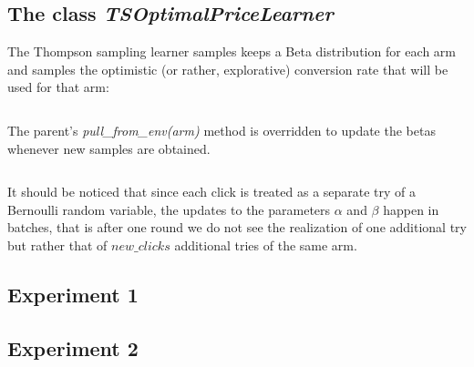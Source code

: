 \documentclass[11pt]{article} %
\begin{document}
\begin{samepage}
\subsection{The class \textit{TSOptimalPriceLearner}}
The Thompson sampling learner samples keeps a Beta distribution for each arm and samples the optimistic (or rather, explorative) conversion rate that will be used for that arm:
\inputminted{python}{code/step3_ts_cr.py}
\end{samepage}
The parent's \textit{pull\_from\_env(arm)} method is overridden to update the betas whenever new samples are obtained.
\inputminted{python}{code/step3_ts_betas.py}
It should be noticed that since each click is treated as a separate try of a Bernoulli random variable, the updates to the parameters $\alpha$ and $\beta$ happen in batches, that is after one round we do not see the realization of one additional try but rather that of $new\_clicks$ additional tries of the same arm.

\clearpage
\subsection{Experiment 1}

\clearpage


\clearpage
\subsection{Experiment 2}

\clearpage


\clearpage
\end{document}
